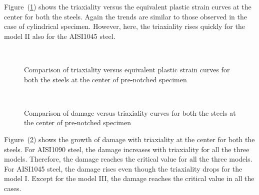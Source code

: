 Figure~(\ref{fig:chap8:equipstrain_vs_triaxiality_583_triaxiality_damage_583}) shows the
triaxiality versus the equivalent plastic strain curves at the center for both the steels. Again the trends are similar to those
observed in the case of cylindrical specimen. However, here, the triaxiality rises quickly for the model II also for the AISI1045 steel.
\begin{figure}[htb]
\centering {} \\
\caption{Comparison of triaxiality versus equivalent plastic strain curves for both the steels at the center of pre-notched specimen} \label{fig:chap8:equipstrain_vs_triaxiality_583_triaxiality_damage_583}
\end{figure}

\begin{figure}[htb]
\centering {} \\
\caption{Comparison of damage versus triaxiality curves for both the steels at the center of pre-notched specimen} \label{fig:chap8:triaxiality_damage_583}
\end{figure}

Figure~(\ref{fig:chap8:triaxiality_damage_583}) shows the growth
of damage with triaxiality at the center for both the steels. For AISI1090 steel, the damage increases with triaxiality
for all the three models. Therefore, the damage reaches the critical value for all the three models.
 For AISI1045 steel, the damage rises even though the triaxiality drops for the model I. Except for the model III,
 the damage reaches the critical value in all the cases.

